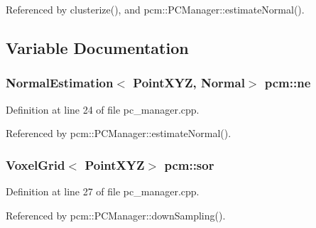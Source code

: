 Referenced by clusterize(), and pcm\-::\-P\-C\-Manager\-::estimate\-Normal().



\subsection{Variable Documentation}
\hypertarget{namespacepcm_acbfa006c5c9699694cdf4f598ff57165}{
\subsubsection[{ne}]{\setlength{\rightskip}{0pt plus 5cm}Normal\-Estimation$<$ Point\-X\-Y\-Z, Normal$>$ pcm\-::ne\hspace{0.3cm}{\ttfamily [static]}}}\label{namespacepcm_acbfa006c5c9699694cdf4f598ff57165}


Definition at line 24 of file pc\-\_\-manager.\-cpp.



Referenced by pcm\-::\-P\-C\-Manager\-::estimate\-Normal().

\hypertarget{namespacepcm_a55d9cba2f3ff7122f9162542cde192ac}{
\subsubsection[{sor}]{\setlength{\rightskip}{0pt plus 5cm}Voxel\-Grid$<$ Point\-X\-Y\-Z$>$ pcm\-::sor\hspace{0.3cm}{\ttfamily [static]}}}\label{namespacepcm_a55d9cba2f3ff7122f9162542cde192ac}


Definition at line 27 of file pc\-\_\-manager.\-cpp.



Referenced by pcm\-::\-P\-C\-Manager\-::down\-Sampling().

